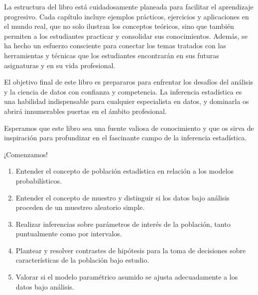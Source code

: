 \documentclass[
  letterpaper,
  DIV=11,
  numbers=noendperiod]{scrreprt}
\begin{document}
La estructura del libro está cuidadosamente planeada para facilitar el
aprendizaje progresivo. Cada capítulo incluye ejemplos prácticos,
ejercicios y aplicaciones en el mundo real, que no solo ilustran los
conceptos teóricos, sino que también permiten a los estudiantes
practicar y consolidar sus conocimientos. Además, se ha hecho un
esfuerzo consciente para conectar los temas tratados con las
herramientas y técnicas que los estudiantes encontrarán en sus futuras
asignaturas y en su vida profesional.

El objetivo final de este libro es prepararos para enfrentar los
desafíos del análisis y la ciencia de datos con confianza y competencia.
La inferencia estadística es una habilidad indispensable para cualquier
especialista en datos, y dominarla os abrirá innumerables puertas en el
ámbito profesional.

Esperamos que este libro sea una fuente valiosa de conocimiento y que os
sirva de inspiración para profundizar en el fascinante campo de la
inferencia estadística.

¡Comenzamos!

\begin{tcolorbox}[enhanced jigsaw, arc=.35mm, breakable, coltitle=black, left=2mm, opacityback=0, bottomtitle=1mm, colbacktitle=quarto-callout-caution-color!10!white, title=\textcolor{quarto-callout-caution-color}{\faFire}\hspace{0.5em}{Resultados de aprendizaje.}, titlerule=0mm, colback=white, colframe=quarto-callout-caution-color-frame, bottomrule=.15mm, rightrule=.15mm, opacitybacktitle=0.6, toptitle=1mm, toprule=.15mm, leftrule=.75mm]

\begin{enumerate}
\def\labelenumi{\arabic{enumi}.}
\item
  Entender el concepto de población estadística en relación a los
  modelos probabilísticos.
\item
  Entender el concepto de muestro y distinguir si los datos bajo
  análisis proceden de un muestreo aleatorio simple.
\item
  Realizar inferencias sobre parámetros de interés de la población,
  tanto puntualmente como por intervalos.
\item
  Plantear y resolver contrastes de hipótesis para la toma de decisiones
  sobre características de la población bajo estudio.
\item
  Valorar si el modelo paramétrico asumido se ajusta adecuadamente a los
  datos bajo análisis.
\end{enumerate}

\end{tcolorbox}
\end{document}
